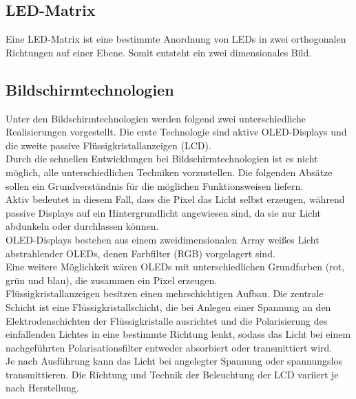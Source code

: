 \subsection{LED-Matrix}
Eine LED-Matrix ist eine bestimmte Anordnung von LEDs in zwei orthogonalen Richtungen auf einer Ebene. Somit entsteht ein zwei dimensionales Bild. 
\subsection{Bildschirmtechnologien}
Unter den Bildschirmtechnologien werden folgend zwei unterschiedliche Realisierungen vorgestellt. Die erste Technologie sind aktive OLED-Displays und die zweite passive Flüssigkristallanzeigen (LCD). \\
Durch die schnellen Entwicklungen bei Bildschirmtechnologien ist es nicht möglich, alle unterschiedlichen Techniken vorzustellen. Die folgenden Absätze sollen ein Grundverständnis für die möglichen Funktionsweisen liefern.\\
Aktiv bedeutet in diesem Fall, dass die Pixel das Licht selbst erzeugen, während passive Displays auf ein Hintergrundlicht angewiesen sind, da sie nur Licht abdunkeln oder durchlassen können. \\
\glqq OLED-Displays bestehen aus einem zweidimensionalen Array weißes Licht abstrahlender OLEDs, denen Farbfilter (RGB) vorgelagert sind.\grqq \cite[Seite 347]{LofflerMang.2020} \\
Eine weitere Möglichkeit wären OLEDs mit unterschiedlichen Grundfarben (rot, grün und blau), die zusammen ein Pixel erzeugen. \\
Flüssigkristallanzeigen besitzen einen mehrschichtigen Aufbau. Die zentrale Schicht ist eine Flüssigkristallschicht, die bei Anlegen einer Spannung an den Elektrodenschichten der Flüssigkristalle ausrichtet und die Polarisierung des einfallenden Lichtes in eine bestimmte Richtung lenkt, sodass das Licht bei einem nachgeführten Polarisationsfilter entweder absorbiert oder transmittiert wird. \cite[][Vgl. Seite 346 f.]{LofflerMang.2020} \\
Je nach Ausführung kann das Licht bei angelegter Spannung oder spannungslos transmittieren. Die Richtung und Technik der Beleuchtung der LCD variiert je nach Herstellung.
